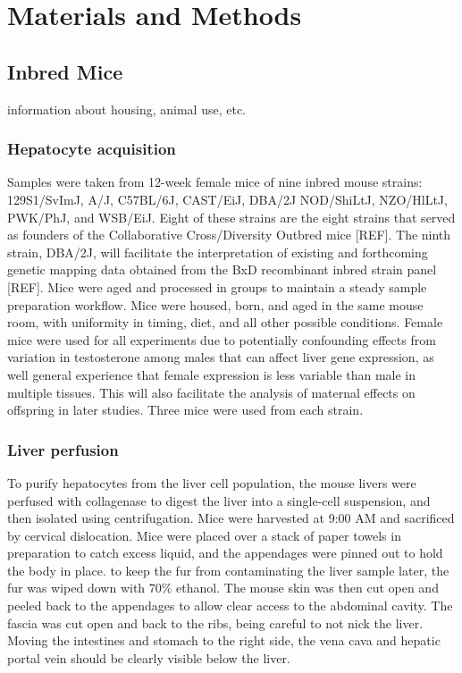 \documentclass[10pt,letterpaper]{article}
\begin{document}
\hypertarget{materials-and-methods}{%
\section{Materials and Methods}\label{materials-and-methods}}

\hypertarget{inbred-mice}{%
\subsection{Inbred Mice}\label{inbred-mice}}

information about housing, animal use, etc.

\hypertarget{hepatocyte-acquisition}{%
\subsubsection{Hepatocyte acquisition}\label{hepatocyte-acquisition}}

Samples were taken from 12-week female mice of nine inbred mouse
strains: 129S1/SvImJ, A/J, C57BL/6J, CAST/EiJ, DBA/2J NOD/ShiLtJ,
NZO/HlLtJ, PWK/PhJ, and WSB/EiJ. Eight of these strains are the eight
strains that served as founders of the Collaborative Cross/Diversity
Outbred mice {[}REF{]}. The ninth strain, DBA/2J, will facilitate the
interpretation of existing and forthcoming genetic mapping data obtained
from the BxD recombinant inbred strain panel {[}REF{]}. Mice were aged
and processed in groups to maintain a steady sample preparation
workflow. Mice were housed, born, and aged in the same mouse room, with
uniformity in timing, diet, and all other possible conditions. Female
mice were used for all experiments due to potentially confounding
effects from variation in testosterone among males that can affect liver
gene expression, as well general experience that female expression is
less variable than male in multiple tissues. This will also facilitate
the analysis of maternal effects on offspring in later studies. Three
mice were used from each strain.

\hypertarget{liver-perfusion}{%
\subsubsection{Liver perfusion}\label{liver-perfusion}}

To purify hepatocytes from the liver cell population, the mouse livers
were perfused with collagenase to digest the liver into a single-cell
suspension, and then isolated using centrifugation. Mice were harvested
at 9:00 AM and sacrificed by cervical dislocation. Mice were placed over
a stack of paper towels in preparation to catch excess liquid, and the
appendages were pinned out to hold the body in place. to keep the fur
from contaminating the liver sample later, the fur was wiped down with
70\% ethanol. The mouse skin was then cut open and peeled back to the
appendages to allow clear access to the abdominal cavity. The fascia was
cut open and back to the ribs, being careful to not nick the liver.
Moving the intestines and stomach to the right side, the vena cava and
hepatic portal vein should be clearly visible below the liver.
\end{document}
